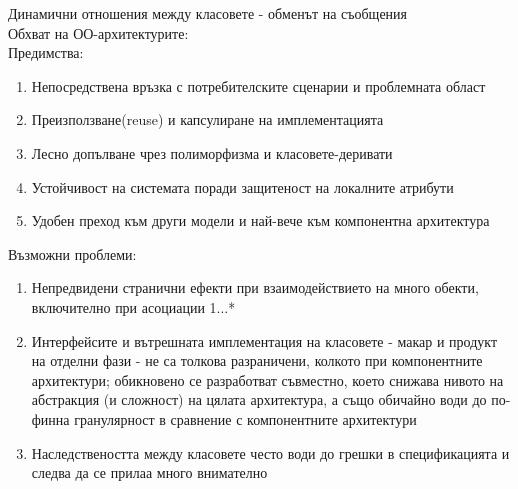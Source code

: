 \documentclass[11pt]{article} %
\begin{document}
Динамични отношения между класовете - обменът на съобщения\\
Обхват на ОО-архитектурите:\\

Предимства:
\begin{enumerate}[noitemsep]
	\item Непосредствена връзка с потребителските сценарии и проблемната област
	\item Преизползване(reuse) и капсулиране на имплементацията
	\item Лесно допълване чрез полиморфизма и класовете-деривати
	\item Устойчивост на системата поради защитеност на локалните атрибути
	\item Удобен преход към други модели и най-вече към компонентна архитектура\\
\end{enumerate}

Възможни проблеми:
\begin{enumerate}[noitemsep]
	\item Непредвидени странични ефекти при взаимодействието на много обекти, включително при асоциации 1...*
	\item Интерфейсите и вътрешната имплементация на класовете - макар и продукт на отделни фази - не са толкова разраничени, колкото при компонентните архитектури; обикновено се разработват съвместно, което снижава нивото на абстракция (и сложност) на цялата архитектура, а също обичайно води до по-финна гранулярност в сравнение с компонентните архитектури
	\item Наследствеността между класовете често води до грешки в спецификацията и следва да се прилаа много внимателно
\end{enumerate}
\end{document}
